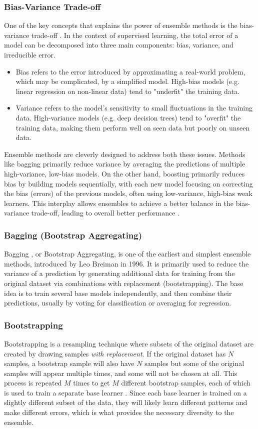 \subsubsection{Bias-Variance Trade-off} 
One of the key concepts that explains the power of ensemble methods is the bias-variance trade-off . In the context of supervised learning, the total error of a model can be decomposed into three main components: bias, variance, and irreducible error. 
\begin{itemize}[noitemsep] 
\item Bias refers to the error introduced by approximating a real-world problem, which may be complicated, by a simplified model. High-bias models (e.g. linear regression on non-linear data) tend to "underfit" the training data.
\item Variance refers to the model's sensitivity to small fluctuations in the training data. High-variance models (e.g. deep decision trees) tend to "overfit" the training data, making them perform well on seen data but poorly on unseen data.
\end{itemize} 
Ensemble methods are cleverly designed to address both these issues. Methods like bagging primarily reduce variance by averaging the predictions of multiple high-variance, low-bias models. On the other hand, boosting primarily reduces bias by building models sequentially, with each new model focusing on correcting the bias (errors) of the previous models, often using low-variance, high-bias weak learners. This interplay allows ensembles to achieve a better balance in the bias-variance trade-off, leading to overall better performance \parencite{zou2021survey}.

\subsubsection{Bagging (Bootstrap Aggregating)} 
Bagging , or Bootstrap Aggregating, is one of the earliest and simplest ensemble methods, introduced by Leo Breiman in 1996. It is primarily used to reduce the variance of a prediction by generating additional data for training from the original dataset via combinations with replacement (bootstrapping). The base idea is to train several base models independently, and then combine their predictions, usually by voting for classification or averaging for regression.

\subsubsection{Bootstrapping} 
Bootstrapping is a resampling technique where subsets of the original dataset are created by drawing samples \textit{with replacement}. If the original dataset has $N$ samples, a bootstrap sample will also have $N$ samples but some of the original samples will appear multiple times, and some will not be chosen at all. This process is repeated $M$ times to get $M$ different bootstrap samples, each of which is used to train a separate base learner \parencite{agrawal2021survey}. Since each base learner is trained on a slightly different subset of the data, they will likely learn different patterns and make different errors, which is what provides the necessary diversity to the ensemble.

